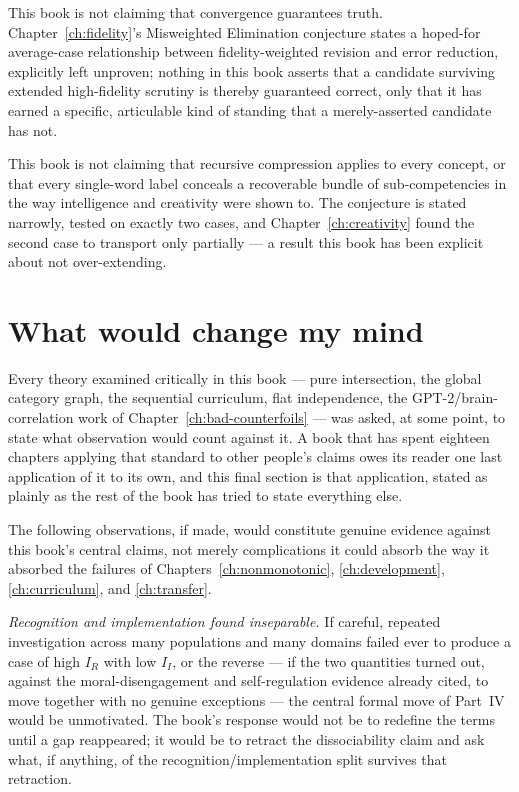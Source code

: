 This book is not claiming that convergence guarantees truth. Chapter~\ref{ch:fidelity}'s Misweighted Elimination conjecture states a hoped-for average-case relationship between fidelity-weighted revision and error reduction, explicitly left unproven; nothing in this book asserts that a candidate surviving extended high-fidelity scrutiny is thereby guaranteed correct, only that it has earned a specific, articulable kind of standing that a merely-asserted candidate has not.

This book is not claiming that recursive compression applies to every concept, or that every single-word label conceals a recoverable bundle of sub-competencies in the way intelligence and creativity were shown to. The conjecture is stated narrowly, tested on exactly two cases, and Chapter~\ref{ch:creativity} found the second case to transport only partially --- a result this book has been explicit about not over-extending.

\section{What would change my mind}

Every theory examined critically in this book --- pure intersection, the global category graph, the sequential curriculum, flat independence, the GPT-2/brain-correlation work of Chapter~\ref{ch:bad-counterfoils} --- was asked, at some point, to state what observation would count against it. A book that has spent eighteen chapters applying that standard to other people's claims owes its reader one last application of it to its own, and this final section is that application, stated as plainly as the rest of the book has tried to state everything else.

The following observations, if made, would constitute genuine evidence against this book's central claims, not merely complications it could absorb the way it absorbed the failures of Chapters~\ref{ch:nonmonotonic}, \ref{ch:development}, \ref{ch:curriculum}, and \ref{ch:transfer}.

\emph{Recognition and implementation found inseparable.} If careful, repeated investigation across many populations and many domains failed ever to produce a case of high $I_R$ with low $I_I$, or the reverse --- if the two quantities turned out, against the moral-disengagement and self-regulation evidence already cited, to move together with no genuine exceptions --- the central formal move of Part~IV would be unmotivated. The book's response would not be to redefine the terms until a gap reappeared; it would be to retract the dissociability claim and ask what, if anything, of the recognition/implementation split survives that retraction.

